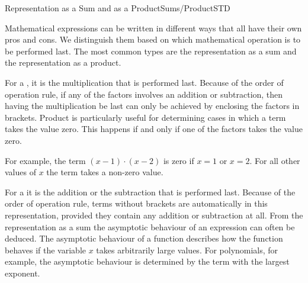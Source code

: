 \begin{MXContent}{Representation as a Sum and as a Product}{Sums/Product}{STD}

% 


Mathematical expressions can be written in different ways that all have their own pros and cons. We distinguish them based on which mathematical operation is to be performed last.
The most common types are the representation as a sum and the representation as a product.


\begin{MInfo}
For a , it is the multiplication that is performed last. Because 
of the order of operation rule, if any of the factors involves an addition or subtraction, then
having the multiplication be last can only be achieved by enclosing the factors in brackets.
Product is particularly useful for determining cases in which a term takes the value zero. This happens if and only if one of the factors takes the value zero.
\end{MInfo}

For example, the term $(x-1)\cdot (x-2)$ is zero if $x=1$ or $x=2$. For all other values of $x$ the term takes a non-zero value.

\begin{MInfo}
For a  it is the addition or the subtraction that is performed last. 
Because of the order of operation rule, terms without brackets are automatically in this representation, provided they contain any addition or subtraction at all. From the representation
as a sum the asymptotic behaviour of an expression can often be deduced.
The asymptotic behaviour of a function  describes how the function behaves if the variable $x$ takes arbitrarily large values. For polynomials, for example, the asymptotic behaviour is determined by the term with the largest exponent.
\end{MInfo}


\end{MXContent}
